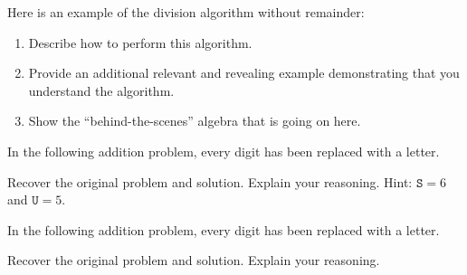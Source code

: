 \documentclass[nooutcomes]{ximera}
\begin{document}
\begin{problem}Here is an example of the division algorithm without remainder:
\begin{image}
\end{image}
\begin{enumerate}
\item Describe how to perform this algorithm.
\item Provide an additional relevant and revealing example
  demonstrating that you understand the algorithm.
\item Show the ``behind-the-scenes'' algebra that is going on here.
\end{enumerate}
\end{problem} 

\begin{problem}In the following addition problem, every digit has been
  replaced with a letter.
\begin{image}
\end{image}
Recover the original problem and solution. Explain your reasoning.
Hint: $\texttt{S}=6$ and $\texttt{U}=5$.
\end{problem} 

\begin{problem}In the following addition problem, every digit has been
  replaced with a letter.
\begin{image}
\end{image}

Recover the original problem and solution. Explain your reasoning.
\end{problem} 
\end{document}
